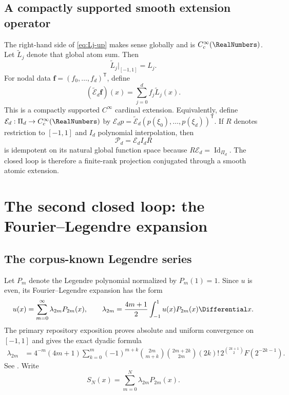 \documentclass[11pt,oneside]{article}
\theoremstyle{definition}
\theoremstyle{remark}
\newcommand{\cE}{\mathcal E}
\newcommand{\cP}{\mathcal P}
\begin{document}
\subsection{A compactly supported smooth extension operator}
The right-hand side of \eqref{eq:Lj-up} makes sense globally and is
$C_c^\infty(\RealNumbers)$.  Let $\widetilde L_j$ denote that global atom sum.  Then
\begin{equation}
 \widetilde L_j|_{[-1,1]}=L_j.
 \label{eq:global-extension}
\end{equation}
For nodal data $\bm f=(f_0,\ldots,f_d)^{\mathsf T}$, define
\begin{equation}
 (\widetilde{\cE}_d\bm f)(x)
 =\sum_{j=0}^{d}f_j\widetilde L_j(x).
 \label{eq:extension-operator}
\end{equation}
This is a compactly supported $C^\infty$ cardinal extension.  Equivalently,
define $\cE_d:\Pi_d\to C_c^\infty(\RealNumbers)$ by
$\cE_dp=\widetilde{\cE}_d(p(\xi_0),\ldots,p(\xi_d))^{\mathsf T}$.
If $R$ denotes restriction to $[-1,1]$ and $I_d$ polynomial interpolation,
then
\begin{equation}
 \cP_d=\cE_d I_d R
 \label{eq:projector}
\end{equation}
is idempotent on its natural global function space because
$R\cE_d=\operatorname{Id}_{\Pi_d}$.  The closed loop is therefore a
finite-rank projection conjugated through a smooth atomic extension.

\section{The second closed loop: the Fourier--Legendre expansion}

\subsection{The corpus-known Legendre series}
Let $P_m$ denote the Legendre polynomial normalized by $P_m(1)=1$.  Since
$u$ is even, its Fourier--Legendre expansion has the form
\begin{equation}
 u(x)=\sum_{m=0}^{\infty}\lambda_{2m}P_{2m}(x),
 \qquad
 \lambda_{2m}=\frac{4m+1}{2}\int_{-1}^{1}u(x)P_{2m}(x)\Differential x.
 \label{eq:Legendre-series}
\end{equation}
The primary repository exposition proves absolute and uniform convergence
on $[-1,1]$ and gives the exact dyadic formula
\begin{align}
 \lambda_{2m}
 &=4^{-m}(4m+1)
 \sum_{k=0}^{m}(-1)^{m+k}
 \binom{2m}{m+k}\binom{2m+2k}{2m}
 (2k)!\,2^{\binom{2k+1}{2}}F(2^{-2k-1}).
 \label{eq:lambda-dyadic}
\end{align}
See \cite{ReshetnikovPrimary}.  Write
\begin{equation}
 S_N(x)=\sum_{m=0}^{N}\lambda_{2m}P_{2m}(x).
 \label{eq:SN}
\end{equation}
\end{document}
